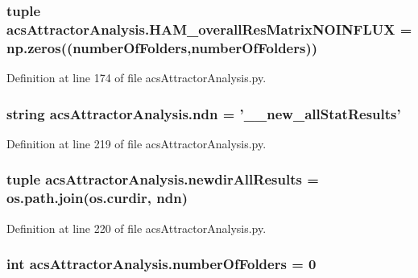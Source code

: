 \hypertarget{a00090_a9aa1adb46370d97e4f38e7f09eb7a97c}{
\subsubsection[{H\-A\-M\-\_\-overall\-Res\-Matrix\-N\-O\-I\-N\-F\-L\-U\-X}]{\setlength{\rightskip}{0pt plus 5cm}tuple acs\-Attractor\-Analysis.\-H\-A\-M\-\_\-overall\-Res\-Matrix\-N\-O\-I\-N\-F\-L\-U\-X = np.\-zeros(({\bf number\-Of\-Folders},{\bf number\-Of\-Folders}))}}\label{a00090_a9aa1adb46370d97e4f38e7f09eb7a97c}


Definition at line 174 of file acs\-Attractor\-Analysis.\-py.

\hypertarget{a00090_a109ce3a379d650b3f9b08debc0433a19}{
\subsubsection[{ndn}]{\setlength{\rightskip}{0pt plus 5cm}string acs\-Attractor\-Analysis.\-ndn = '\-\_\-\_\-new\-\_\-all\-Stat\-Results'}}\label{a00090_a109ce3a379d650b3f9b08debc0433a19}


Definition at line 219 of file acs\-Attractor\-Analysis.\-py.

\hypertarget{a00090_ae620f985669aed90dc070824420d4b5e}{
\subsubsection[{newdir\-All\-Results}]{\setlength{\rightskip}{0pt plus 5cm}tuple acs\-Attractor\-Analysis.\-newdir\-All\-Results = os.\-path.\-join(os.\-curdir, {\bf ndn})}}\label{a00090_ae620f985669aed90dc070824420d4b5e}


Definition at line 220 of file acs\-Attractor\-Analysis.\-py.

\hypertarget{a00090_aa5d2495d08b8ad5ebf34f85d5417e93c}{
\subsubsection[{number\-Of\-Folders}]{\setlength{\rightskip}{0pt plus 5cm}int acs\-Attractor\-Analysis.\-number\-Of\-Folders = 0}}\label{a00090_aa5d2495d08b8ad5ebf34f85d5417e93c}


